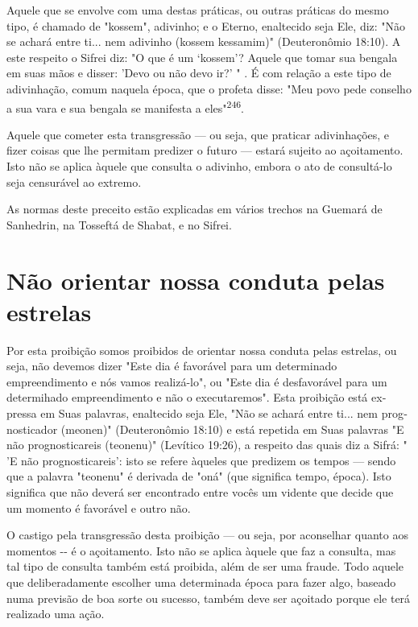 \begin{itemize}
\begin{enumrate}
\begin{itemize}
\begin{itemize}
\begin{itemize}
Aquele que se envolve com uma destas práticas, ou outras práticas do
mesmo tipo, é chamado de "kossem", adivinho; e o Eterno, enaltecido seja
Ele, diz: "Não se achará entre ti... nem adivinho (kossem kessamim)"
(Deutero­nômio 18:10). A este respeito o Sifrei diz: "O que é um
`kossem'? Aquele que tomar sua bengala em suas mãos e disser: 'Devo ou
não devo ir?' " . É com rela­ção a este tipo de adivinhação, comum
naquela época, que o profeta disse: "Meu povo pede conselho a sua vara e
sua bengala se manifesta a eles"\textsuperscript{246}.

Aquele que cometer esta transgressão --- ou seja, que praticar
adivi­nhações, e fizer coisas que lhe permitam predizer o futuro ---
estará sujeito ao açoitamento. Isto não se aplica àquele que consulta o
adivinho, embora o ato de consultá-lo seja censurável ao extremo.

As normas deste preceito estão explicadas em vários trechos na Gue­mará
de Sanhedrin, na Tosseftá de Shabat, e no Sifrei.

\section{Não orientar nossa conduta pelas estrelas}

Por esta proibição somos proibidos de orientar nossa conduta pelas
estrelas, ou seja, não devemos dizer "Este dia é favorável para um
determinado empreendimento e nós vamos realizá-lo", ou "Este dia é
desfavorável para um determihado empreendimento e não o executaremos".
Esta proibição está ex­pressa em Suas palavras, enaltecido seja Ele,
"Não se achará entre ti... nem prog­nosticador (meonen)" (Deuteronômio
18:10) e está repetida em Suas palavras "E não prognosticareis
(teonenu)" (Levítico 19:26), a respeito das quais diz a Sifrá: " 'E não
prognosticareis': isto se refere àqueles que predizem os tempos ---
sendo que a palavra "teonenu" é derivada de "oná" (que significa tempo,
época). Isto significa que não deverá ser encontrado entre vocês um
vidente que decide que um momento é favorável e outro não.

O castigo pela transgressão desta proibição --- ou seja, por aconse­lhar
quanto aos momentos -\/- é o açoitamento. Isto não se aplica àquele que
faz a consulta, mas tal tipo de consulta também está proibida, além de
ser uma fraude. Todo aquele que deliberadamente escolher uma determinada
época para fazer algo, baseado numa previsão de boa sorte ou sucesso,
também deve ser açoitado porque ele terá realizado uma ação.


\end{itemize}
\end{itemize}
\end{itemize}
\end{enumrate}
\end{itemize}

